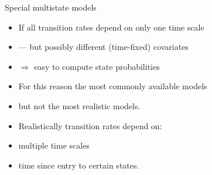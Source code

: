 \begin{frame}{Special multistate models}
  \begin{itemize}
  \item If all transition rates depend on only one time scale
  \item --- but possibly different (time-fixed) covariates
  \item $\Rightarrow$ easy to compute state probabilities
  \item For this reason the most commonly available models
  \item but not the most realistic models.
  \item Realistically transition rates depend on:
    \item multiple time scales
    \item time since entry to certain states.
  \end{itemize}
\end{frame}
